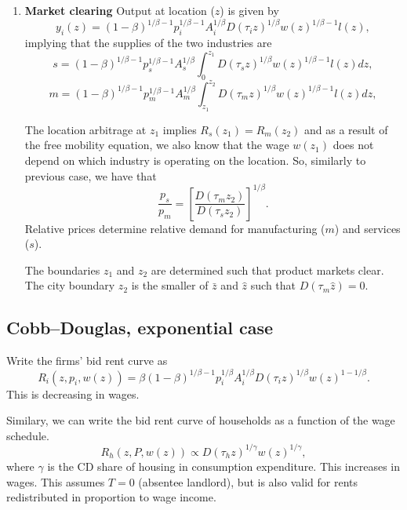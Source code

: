 \documentclass[10pt]{article}
\begin{document}
\begin{enumerate}
\item \textbf{Market clearing}
Output at location ($z$) is given by
\begin{equation*}
y_i(z)=(1-\beta)^{1/\beta-1}p_i^{1/\beta-1}A_i^{1/\beta}D(\tau_iz)^{1/\beta}w(z)^{1/\beta-1}l(z),
\end{equation*}
implying that the supplies of the two industries are
\begin{equation*}
s=(1-\beta)^{1/\beta-1}p_s^{1/\beta-1}A_s^{1/\beta}\int_0^{z_1}D(\tau_sz)^{1/\beta}w(z)^{1/\beta-1}l(z)dz,
\end{equation*}
\begin{equation*}
m=(1-\beta)^{1/\beta-1}p_m^{1/\beta-1}A_m^{1/\beta}\int_{z_1}^{z_2}D(\tau_mz)^{1/\beta}w(z)^{1/\beta-1}l(z)dz,
\end{equation*}

The location arbitrage at $z_1$ implies $R_s(z_1)=R_m(z_2)$ and as a result of the free mobility equation, we also know that the wage $w(z_1)$ does not depend on which industry is operating on the location. So, similarly to previous case, we have that
\begin{equation}
\frac{p_s}{p_m}=\left[\frac{D(\tau_mz_2)}{D(\tau_sz_2)}\right]^{1/\beta}.
\end{equation}
Relative prices determine relative demand for manufacturing ($m$) and services ($s$).

The boundaries $z_1$ and $z_2$ are determined such that product markets clear. The city boundary $z_2$ is the smaller of $\bar{z}$ and $\hat{z}$ such that $D(\tau_m\hat{z})=0$.
\end{enumerate}

\subsection{Cobb--Douglas, exponential case}
Write the firms' bid rent curve as
\begin{equation*}
R_i(z,p_i,w(z)) = \beta (1-\beta)^{1/\beta-1} p_i^{1/\beta} A_i^{1/\beta} D(\tau_i z)^{1/\beta}w(z)^{1-1/\beta}.
\end{equation*}
This is decreasing in wages.

Similary, we can write the bid rent curve of households as a function of the wage schedule.
\[
R_h(z,P,w(z)) \propto D(\tau_h z)^{1/\gamma}w(z)^{1/\gamma},
\]
where $\gamma$ is the CD share of housing in consumption expenditure. This increases in wages. This assumes $T=0$ (absentee landlord), but is also valid for rents redistributed in proportion to wage income.
\end{document}
